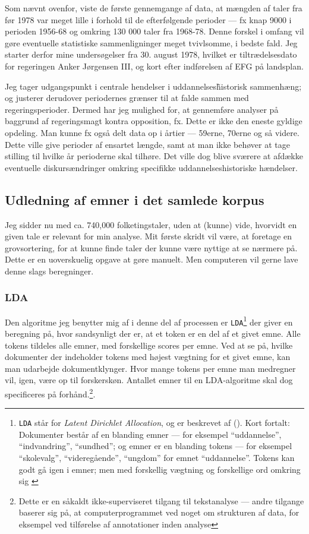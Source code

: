 Som nævnt ovenfor, viste de første gennemgange af data, at mængden af taler fra før 1978 var meget lille i forhold til de efterfølgende perioder — fx knap 9000 i perioden 1956-68 og omkring 130 000 taler fra 1968-78.
Denne forskel i omfang vil gøre eventuelle statistiske sammenligninger meget tvivlsomme, i bedste fald.
Jeg starter derfor mine undersøgelser fra 30. august 1978, hvilket er tiltrædelsesdato for regeringen Anker Jørgensen III, og kort efter indførelsen af EFG på landsplan.

Jeg tager udgangspunkt i centrale hendelser i uddannelses\~historisk sammenhæng; og justerer derudover periodernes grænser til at falde sammen med regeringsperioder.
Dermed har jeg mulighed for, at gennemføre analyser på baggrund af regeringsmagt kontra opposition, fx.
Dette er ikke den eneste gyldige opdeling.
Man kunne fx også delt data op i årtier — 59erne, 70erne og så videre.
Dette ville give perioder af ensartet længde, samt at man ikke behøver at tage stilling til hvilke år perioderne skal tilhøre.
Det ville dog blive sværere at afdække eventuelle diskursændringer omkring specifikke uddannelseshistoriske hændelser.

\subsection{Udledning af emner i det samlede korpus}

Jeg sidder nu med ca. 740,000 folketingstaler, uden at (kunne) vide, hvorvidt en given tale er relevant for min analyse.
Mit første skridt vil være, at foretage en grovsortering, for at kunne finde taler der kunne være nyttige at se nærmere på.
Dette er en uoverskuelig opgave at gøre manuelt.
Men computeren vil gerne lave denne slags beregninger.

\subsubsection{LDA}
Den algoritme jeg benytter mig af i denne del af processen er \texttt{LDA}\footnote{\texttt{LDA} står for \textit{Latent Dirichlet Allocation}, og er beskrevet af \citeauthor{bleiLatentDirichletAllocation2003} (\citeyear{bleiLatentDirichletAllocation2003}). Kort fortalt: Dokumenter består af en blanding emner --- for eksempel “uddannelse”, “indvandring”, “sundhed”; og emner er en blanding tokens --- for eksempel “skolevalg”, “videregående”, “ungdom” for emnet “uddannelse”. Tokens kan godt gå igen i emner; men med forskellig vægtning og forskellige ord omkring sig \autocite[s. 86]{silgeTextMiningTidy2017}
}
der giver en beregning på, hvor sandsynligt der er, at et token er en del af et givet emne.
Alle tokens tildeles alle emner, med forskellige scores per emne.
Ved at se på, hvilke dokumenter der indeholder tokens med højest vægtning for et givet emne, kan man udarbejde dokumentklynger.
Hvor mange tokens per emne man medregner vil, igen, være op til forskerskøn.
Antallet emner til en LDA-algoritme skal dog specificeres på forhånd.\footnote{Dette er en såkaldt ikke-superviseret tilgang til tekstanalyse --- andre tilgange baserer sig på, at computerprogrammet ved noget om strukturen af data, for eksempel ved tilførelse af annotationer inden analyse}.

